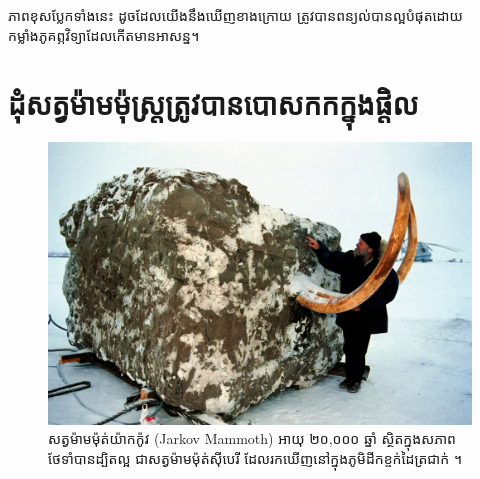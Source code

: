 \documentclass[10pt,twocolumn,letterpaper]{article}
\begin{document}
ភាពខុសប្លែកទាំងនេះ ដូចដែលយើងនឹងឃើញខាងក្រោយ ត្រូវបានពន្យល់បានល្អបំផុតដោយកម្លាំងភូគព្ភវិទ្យាដែលកើតមានអាសន្ន។

\section{ដុំសត្វម៉ាមម៉ុស្ដ្រត្រូវបានបោសកកក្នុងផ្តិល}
\begin{figure}[t]
\begin{center}
   \includegraphics[width=1\linewidth]{jarkov-mammoth.jpg}
\end{center}
   \caption{សត្វម៉ាមម៉ុត់យ៉ាកក៉ូវ (Jarkov Mammoth) អាយុ ២០,០០០ ឆ្នាំ ស្ថិតក្នុងសភាពថែទាំបានដ្បិតល្អ ជាសត្វម៉ាមម៉ុត់ស៊ីបេរី ដែលរកឃើញនៅក្នុងភូមិដីកខ្ចក់ដៃត្រជាក់ \cite{51}។}
\label{fig:1}
\label{fig:onecol}
\end{figure}
\end{document}
